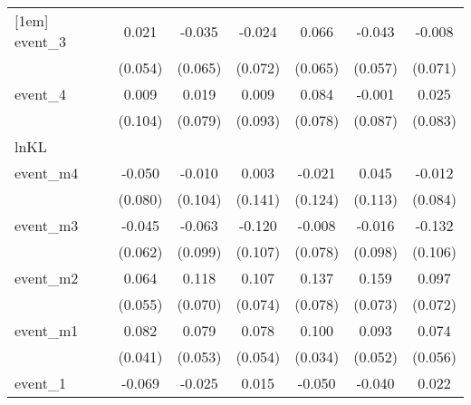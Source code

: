 {\begin{tabular}{l*{6}{c}}
[1em]
event\_3     &       0.021         &      -0.035         &      -0.024         &       0.066         &      -0.043         &      -0.008         \\
            &     (0.054)         &     (0.065)         &     (0.072)         &     (0.065)         &     (0.057)         &     (0.071)         \\
[1em]
event\_4     &       0.009         &       0.019         &       0.009         &       0.084         &      -0.001         &       0.025         \\
            &     (0.104)         &     (0.079)         &     (0.093)         &     (0.078)         &     (0.087)         &     (0.083)         \\
\hline
lnKL        &                     &                     &                     &                     &                     &                     \\
event\_m4    &      -0.050         &      -0.010         &       0.003         &      -0.021         &       0.045         &      -0.012         \\
            &     (0.080)         &     (0.104)         &     (0.141)         &     (0.124)         &     (0.113)         &     (0.084)         \\
[1em]
event\_m3    &      -0.045         &      -0.063         &      -0.120         &      -0.008         &      -0.016         &      -0.132         \\
            &     (0.062)         &     (0.099)         &     (0.107)         &     (0.078)         &     (0.098)         &     (0.106)         \\
[1em]
event\_m2    &       0.064         &       0.118         &       0.107         &       0.137         &       0.159\sym{*}  &       0.097         \\
            &     (0.055)         &     (0.070)         &     (0.074)         &     (0.078)         &     (0.073)         &     (0.072)         \\
[1em]
event\_m1    &       0.082\sym{*}  &       0.079         &       0.078         &       0.100\sym{**} &       0.093         &       0.074         \\
            &     (0.041)         &     (0.053)         &     (0.054)         &     (0.034)         &     (0.052)         &     (0.056)         \\
[1em]
event\_1     &      -0.069         &      -0.025         &       0.015         &      -0.050         &      -0.040         &       0.022         \\

\end{tabular}}
